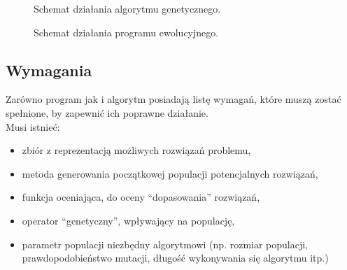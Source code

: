 \documentclass[twoside,a4paper,10]{book}
\begin{document}
\begin{figure}[!h]
		\centering
		\caption{Schemat działania algorytmu genetycznego.}
		\label{fig:roznice_alg}
		\caption{Schemat działania programu ewolucyjnego.}
		\label{fig:roznice_prog}
\end{figure}
\subsection{Wymagania}
Zarówno program jak i algorytm posiadają listę wymagań, które muszą zostać spełnione, by zapewnić ich poprawne działanie.~\cite{algBook}\\
Musi istnieć:
~\begin{itemize}
\item
zbiór z reprezentacją możliwych rozwiązań problemu,
\item
metoda generowania początkowej populacji potencjalnych rozwiązań, 
\item
funkcja oceniająca, do oceny “dopasowania” rozwiązań,
\item
operator “genetyczny”, wpływający na populację,
\item
parametr populacji niezbędny algorytmowi (np. rozmiar populacji, prawdopodobieństwo mutacji, długość wykonywania się algorytmu itp.) 

\end{itemize}




   
\end{document}
